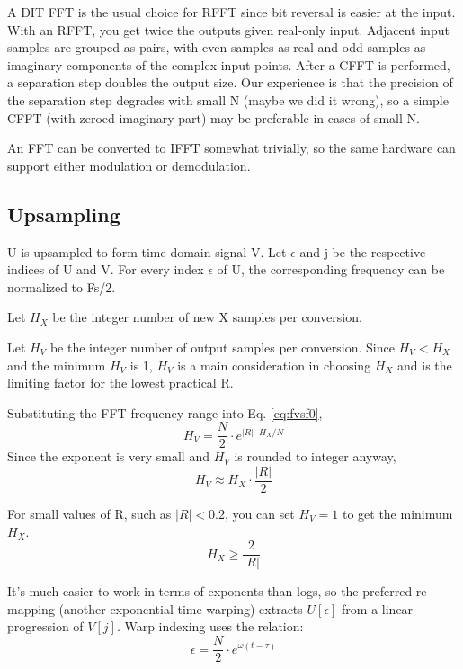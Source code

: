 A DIT FFT is the usual choice for RFFT since bit reversal is easier at the input.
With an RFFT, you get twice the outputs given real-only input.
Adjacent input samples are grouped as pairs, with even samples as real and odd
samples as imaginary components of the complex input points.
After a CFFT is performed, a separation step doubles the output size.
Our experience is that the precision of the separation step degrades with small N
(maybe we did it wrong), so a simple CFFT (with zeroed imaginary part)
may be preferable in cases of small N.

An FFT can be converted to IFFT somewhat trivially, so the same hardware can
support either modulation or demodulation.

\subsection{Upsampling}

U is upsampled to form time-domain signal V.
Let $\epsilon$ and j be the respective indices of U and V.
For every index $\epsilon$ of U, the corresponding frequency can be normalized
to Fs/2. 

Let $H_X$ be the integer number of new X samples per conversion.

Let $H_V$ be the integer number of output samples per conversion.
Since $H_V < H_X$ and the minimum $H_V$ is 1, $H_V$ is a main consideration in
choosing $H_X$ and is the limiting factor for the lowest practical R.

Substituting the FFT frequency range into Eq. \ref{eq:fvsf0}, 
\begin{equation}
H_V = \frac{N}{2} \cdot e^{|R| \cdot H_X / N}
\end{equation}
Since the exponent is very small and $H_V$ is rounded to integer anyway,
\begin{equation}
H_V \approx H_X \cdot \frac{|R|}{2}
\end{equation}

For small values of R, such as $|R| < 0.2$,
you can set $H_V = 1$ to get the minimum $H_X$.
\begin{equation}
H_X \geq \frac{2}{|R|}
\end{equation}

It's much easier to work in terms of exponents than logs,
so the preferred re-mapping (another exponential time-warping) extracts
$U[\epsilon]$ from a linear progression of $V[j]$.
Warp indexing uses the relation:
\begin{equation}
\epsilon = \frac{N}{2} \cdot e^{\omega(t - \tau)}
\end{equation}


